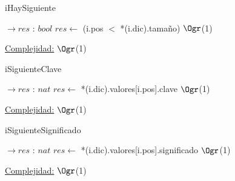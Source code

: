 \begin{Algoritmos}
	
	\begin{algorithm}[H]
		\caption{iHaySiguiente}
		\begin{algorithmic}
			 $\to res$ : $bool$
				\State $res \gets$ (i.pos $<$ *(i.dic).tamaño) \Comment $\Ogr$(1)
			\EndProcedure
		\end{algorithmic}
		\underline{Complejidad:} $\Ogr$(1)
	\end{algorithm}

	\begin{algorithm}[H]
		\caption{iSiguienteClave}
		\begin{algorithmic}
			 $\to res$ : $nat$
				\State $res \gets$ *(i.dic).valores[i.pos].clave \Comment $\Ogr$(1)
			\EndProcedure
		\end{algorithmic}
		\underline{Complejidad:} $\Ogr$(1)
	\end{algorithm}
	
	\begin{algorithm}[H]
		\caption{iSiguienteSignificado}
		\begin{algorithmic}
			 $\to res$ : $nat$
				\State $res \gets$ *(i.dic).valores[i.pos].significado \Comment $\Ogr$(1)
			\EndProcedure
		\end{algorithmic}
		\underline{Complejidad:} $\Ogr$(1)
	\end{algorithm}
	
\end{Algoritmos}